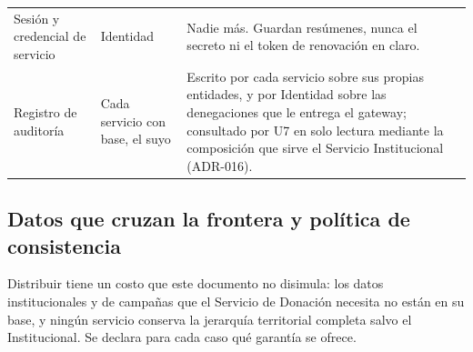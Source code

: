 \documentclass[11pt,a4paper]{article}
\begin{document}
\begin{longtable}{L{3.4cm} L{5.0cm} L{5.8cm}}
Sesión y credencial de servicio & Identidad & Nadie más. Guardan resúmenes, nunca el secreto ni el token de renovación en claro. \\
Registro de auditoría & Cada servicio con base, el suyo & Escrito por cada servicio sobre sus propias entidades, y por Identidad sobre las denegaciones que le entrega el gateway; consultado por U7 en solo lectura mediante la composición que sirve el Servicio Institucional (ADR-016). \\
\end{longtable}

\subsection{Datos que cruzan la frontera y política de consistencia}
\label{sec:consistencia}

Distribuir tiene un costo que este documento no disimula: los datos institucionales y de campañas que el Servicio de Donación necesita no están en su base, y ningún servicio conserva la jerarquía territorial completa salvo el Institucional. Se declara para cada caso qué garantía se ofrece.
\end{document}
